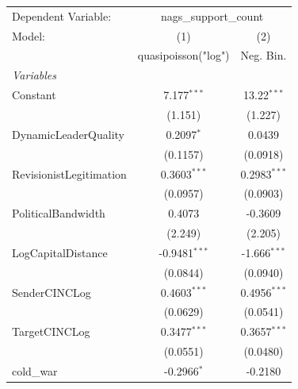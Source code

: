 
\begingroup
\centering
\begin{tabular}{lcc}
   \tabularnewline \midrule \midrule
   Dependent Variable: & \multicolumn{2}{c}{nags\_support\_count}\\
   Model:                                                 & (1)                  & (2)\\  
                                                          &  quasipoisson("log") & Neg. Bin.\\  
   \midrule
   \emph{Variables}\\
   Constant                                               & 7.177$^{***}$        & 13.22$^{***}$\\   
                                                          & (1.151)              & (1.227)\\   
   DynamicLeaderQuality                                   & 0.2097$^{*}$         & 0.0439\\   
                                                          & (0.1157)             & (0.0918)\\   
   RevisionistLegitimation                                & 0.3603$^{***}$       & 0.2983$^{***}$\\   
                                                          & (0.0957)             & (0.0903)\\   
   PoliticalBandwidth                                     & 0.4073               & -0.3609\\   
                                                          & (2.249)              & (2.205)\\   
   LogCapitalDistance                                     & -0.9481$^{***}$      & -1.666$^{***}$\\   
                                                          & (0.0844)             & (0.0940)\\   
   SenderCINCLog                                          & 0.4603$^{***}$       & 0.4956$^{***}$\\   
                                                          & (0.0629)             & (0.0541)\\   
   TargetCINCLog                                          & 0.3477$^{***}$       & 0.3657$^{***}$\\   
                                                          & (0.0551)             & (0.0480)\\   
   cold\_war                                              & -0.2966$^{*}$        & -0.2180\\   

\end{tabular}
